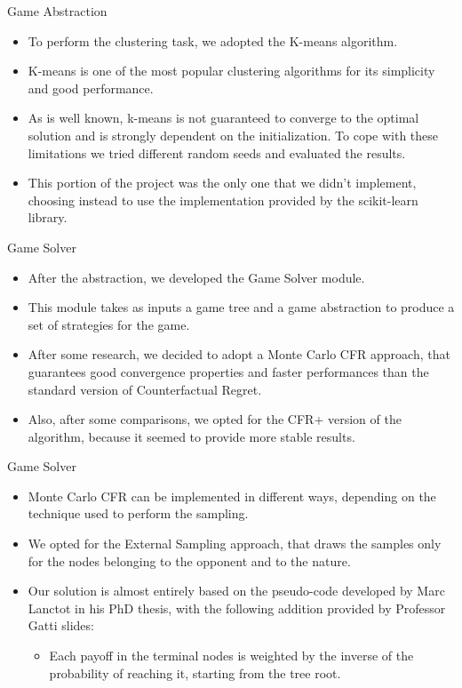 \documentclass[11pt]{beamer}
\begin{document}
\begin{frame}{Game Abstraction}
\begin{itemize}
\item To perform the clustering task, we adopted the K-means algorithm.
\item K-means is one of the most popular clustering algorithms for its simplicity and good performance.
\item As is well known, k-means is not guaranteed to converge to the optimal solution and is strongly dependent on the initialization. To cope with these limitations we tried different random seeds and evaluated the results. 
\item This portion of the project was the only one that we didn't implement, choosing instead to use the implementation provided by the scikit-learn library.
\end{itemize}
\end{frame}

\begin{frame}{Game Solver}
\begin{itemize}
\item After the abstraction, we developed the Game Solver module.
\item This module takes as inputs a game tree and a game abstraction to produce a set of strategies for the game.
\item After some research, we decided to adopt a Monte Carlo CFR approach, that guarantees good convergence properties and faster performances than the standard version of Counterfactual Regret.
\item Also, after some comparisons, we opted for the CFR+ version of the algorithm, because it seemed to provide more stable results.
\end{itemize}
\end{frame}

\begin{frame}{Game Solver}
\begin{itemize}
\item Monte Carlo CFR can be implemented in different ways, depending on the technique used to perform the sampling.
\item We opted for the External Sampling approach, that draws the samples only for the nodes belonging to the opponent and to the nature.
\item Our solution is almost entirely based on the pseudo-code developed by Marc Lanctot in his PhD thesis, with the following addition provided by Professor Gatti slides:
\begin{itemize}
\item Each payoff in the terminal nodes is weighted by the inverse of the probability of reaching it, starting from the tree root.
\end{itemize}
\end{itemize}
\end{frame}
\end{document}
